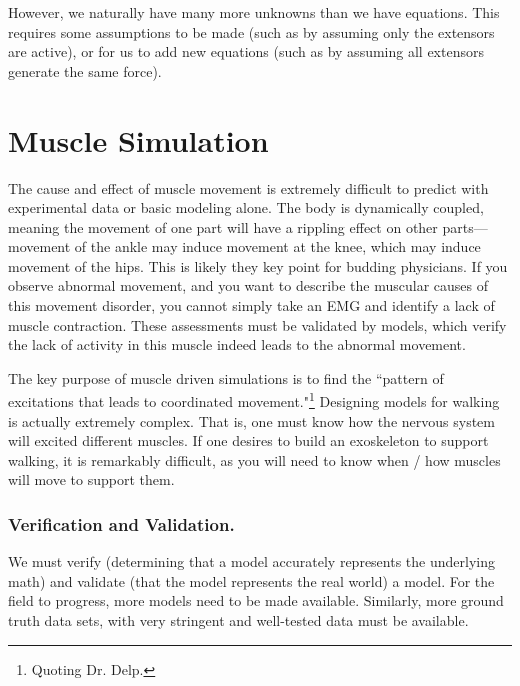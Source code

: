 However, we naturally have many more unknowns than we have equations. This requires some assumptions to be made (such as by assuming only the extensors are active), or for us to add new equations (such as by assuming all extensors generate the same force). 



\section{Muscle Simulation}

The cause and effect of muscle movement is extremely difficult to predict with experimental data or basic modeling alone. The body is dynamically coupled, meaning the movement of one part will have a rippling effect on other parts---movement of the ankle may induce movement at the knee, which may induce movement of the hips. This is likely they key point for budding physicians. If you observe abnormal movement, and you want to describe the muscular causes of this movement disorder, you cannot simply take an EMG and identify a lack of muscle contraction. These assessments must be validated by models, which verify the lack of activity in this muscle indeed leads to the abnormal movement.\newline

The key purpose of muscle driven simulations is to find the ``pattern of excitations that leads to coordinated movement."\footnote{Quoting Dr. Delp.} Designing models for walking is actually extremely complex. That is, one must know how the nervous system will excited different muscles. If one desires to build an exoskeleton to support walking, it is remarkably difficult, as you will need to know when / how muscles will move to support them. 

\subsubsection{Verification and Validation.}

We must verify (determining that a model accurately represents the underlying math) and validate (that the model represents the real world) a model. For the field to progress, more models need to be made available. Similarly, more ground truth data sets, with very stringent and well-tested data must be available. 










